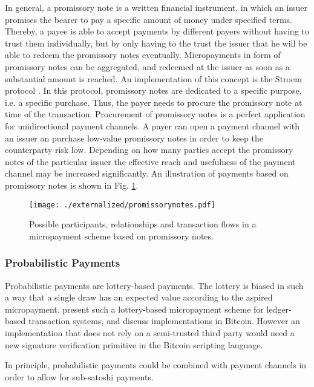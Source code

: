 In general, a promissory note is a written financial instrument, in which an issuer promises the bearer to pay a specific amount of money under specified terms. Thereby, a payee is able to accept payments by different payers without having to trust them individually, but by only having to the trust the issuer that he will be able to redeem the promissory notes eventually. Micropayments in form of promissory notes can be aggregated, and redeemed at the issuer as soon as a substantial amount is reached. An implementation of this concept is the Stroem protocol \parencite{strawpay}. In this protocol, promissory notes are dedicated to a specific purpose, i.e. a specific purchase. Thus, the payer needs to procure the promissory note at time of the transaction. Procurement of promissory notes is a perfect application for unidirectional payment channels. A payer can open a payment channel with an issuer an purchase low-value promissory notes in order to keep the counterparty risk low. Depending on how many parties accept the promissory notes of the particular issuer the effective reach and usefulness of the payment channel may be increased significantly. An illustration of payments based on promissory notes is shown in Fig. \ref{fig:promissorynotes}.

\begin{figure}
\centering
\texttt{[image: ./externalized/promissorynotes.pdf]}
\caption{Possible participants, relationships and transaction flows in a micropayment scheme based on promissory notes.}
\label{fig:promissorynotes}
\end{figure}

\subsubsection{Probabilistic Payments}

Probabilistic payments \cite{wheeler1996transactions,rivest1996payword,rivest1997electronic} are lottery-based payments. The lottery is biased in such a way that a single draw has an expected value according to the aspired micropayment.
\cite{Pass:2015:MDC:2810103.2813713} present such a lottery-based micropayment scheme for ledger-based transaction systems, and discuss implementations in Bitcoin. However an implementation that does not rely on a semi-trusted third party would need a new signature verification primitive in the Bitcoin scripting language. 

In principle, probabilistic payments could be combined with payment channels in order to allow for sub-satoshi payments.


